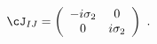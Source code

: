 \begin{equation}
\cJ_{IJ}=
\left(
\begin{array}{cc}
-i\sigma_2 & 0 \\
0         & i\sigma_2 
\end{array}
\right) \ .
\end{equation}

